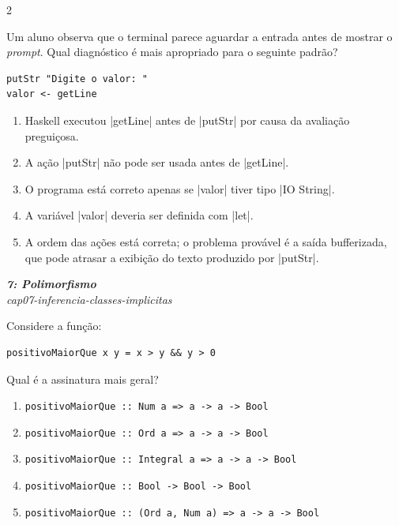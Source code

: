 \documentclass[a4paper,10pt,brazil]{article}
\begin{document}
\begin{multicols}{2}
\begin{flushright}
\end{flushright}
Um aluno observa que o terminal parece aguardar a entrada antes de mostrar o \emph{prompt}. Qual diagnóstico é mais apropriado para o seguinte padrão?

\begin{verbatim}
putStr "Digite o valor: "
valor <- getLine
\end{verbatim}

\begin{enumerate}
  \item Haskell executou \haskellinline|getLine| antes de \haskellinline|putStr| por causa da avaliação preguiçosa.

  \item A ação \haskellinline|putStr| não pode ser usada antes de \haskellinline|getLine|.

  \item O programa está correto apenas se \haskellinline|valor| tiver tipo \haskellinline|IO String|.

  \item A variável \haskellinline|valor| deveria ser definida com \haskellinline|let|.

  \item A ordem das ações está correta; o problema provável é a saída bufferizada, que pode atrasar a exibição do texto produzido por \haskellinline|putStr|.


\end{enumerate}

\begin{flushright}
  \footnotesize
  \textit{\textbf{7: Polimorfismo}}\\
  \textit{cap07-inferencia-classes-implicitas}\\

\end{flushright}
Considere a função:

\begin{verbatim}
positivoMaiorQue x y = x > y && y > 0
\end{verbatim}

Qual é a assinatura mais geral?

\begin{enumerate}
  \item \texttt{positivoMaiorQue :: Num a => a -> a -> Bool}
  \item \texttt{positivoMaiorQue :: Ord a => a -> a -> Bool}
  \item \texttt{positivoMaiorQue :: Integral a => a -> a -> Bool}
  \item \texttt{positivoMaiorQue :: Bool -> Bool -> Bool}
  \item \texttt{positivoMaiorQue :: (Ord a, Num a) => a -> a -> Bool}


\end{enumerate}
\end{multicols}
\end{document}
